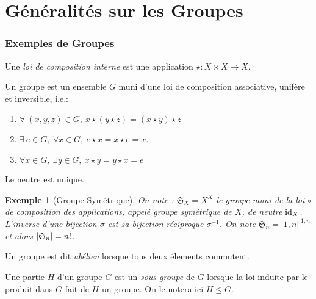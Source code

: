 \documentclass{cours}
\newtheorem{example}{Exemple}[section]
\begin{document}
\part{Généralités sur les Groupes}
\section{Exemples de Groupes}
\begin{definition}
    Une \emph{loi de composition interne} est une application $\star : X \times X \rightarrow X$.
\end{definition}
\begin{definition}[Groupe]
    Un groupe est un ensemble $G$ muni d'une loi de composition associative, unifère et inversible, i.e.:
    \begin{enumerate}
        \item $\forall \ (x, y, z) \in G, \ x \star (y \star z) = (x \star y) \star z$ 
        \item $\exists \ e \in G,\ \forall x \in G, \ e\star x = x \star e = x$.
        \item $\forall x \in G, \ \exists y \in G, \ x \star y = y \star x = e$
    \end{enumerate}
\end{definition}

\begin{remark}
    Le neutre est unique.
\end{remark}

\begin{example}[Groupe Symétrique]
    On note : $\mathfrak{S}_{X} = X^{X}$ le groupe muni de la loi $\circ$ de composition des applications, appelé \emph{groupe symétrique} de $X$, de neutre $\textmd{id}_{X}$. L'inverse d'une bijection $\sigma$ est sa bijection réciproque $\sigma^{-1}$. On note $\mathfrak{S}_{n} = \lvert 1, n\rvert^{\lvert 1, n\rvert}$ et alors $\left|\mathfrak{S}_{n}\right| = n!$.
\end{example}

\begin{definition}
    Un groupe est dit \emph{abélien} lorsque tous deux élements commutent.
\end{definition}

\begin{definition}
    Une partie $H$ d'un groupe $G$ est un \emph{sous-groupe} de $G$ lorsque la loi induite par le produit dans $G$ fait de $H$ un groupe. On le notera ici $H \leq G$.
\end{definition}
\end{document}
